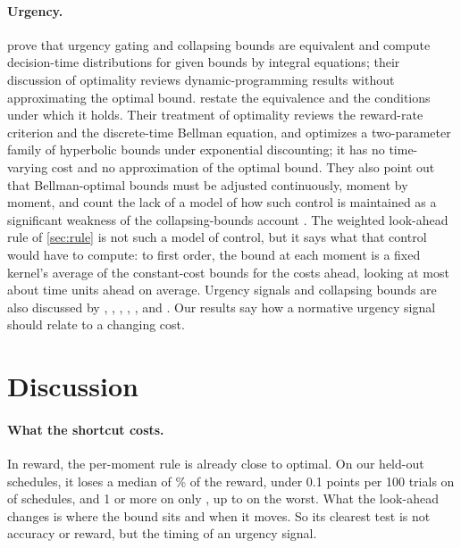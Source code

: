 \documentclass[11pt]{article}
\theoremstyle{definition}
\theoremstyle{remark}
\begin{document}
\paragraph{Urgency.}
\citet{smith2022} prove that urgency gating and collapsing bounds are equivalent and compute
decision-time distributions for given bounds by integral equations; their discussion of optimality
reviews dynamic-programming results without approximating the optimal bound.
 restate the equivalence and the conditions under which it holds. Their
treatment of optimality reviews the reward-rate criterion and the discrete-time Bellman equation,
and optimizes a two-parameter family of hyperbolic bounds under exponential discounting; it has no
time-varying cost and no approximation of the optimal bound. They also point out that Bellman-optimal bounds must be adjusted continuously, moment by moment,
and count the lack of a model of how such control is maintained as a significant weakness of the
collapsing-bounds account \citep[p.~163]{smith2025}. The weighted look-ahead rule of
\cref{sec:rule} is not such a model of control, but it says what that control would have to
compute: to first order, the bound at each moment is a fixed kernel's average of the
constant-cost bounds for the costs ahead, looking at most about \MaxLookAhead{} time units ahead on
average. Urgency signals and
collapsing bounds are also discussed by \citet{cisek2009},
\citet{thura2012}, \citet{hanks2014}, \citet{murphy2016}, \citet{hawkins2015}, and
\citet{voskuilen2016}. Our results say how a normative urgency signal should
relate to a changing cost.

\section{Discussion}
\label{sec:discussion}

\paragraph{What the shortcut costs.}
In reward, the per-moment rule is already close to optimal. On our held-out schedules, it loses a
median of \HeldShareMedian\% of the reward, under 0.1 points per 100 trials on
\HeldPerMomentUnderTenth{} of \HeldCount{} schedules, and 1 or more on only \HeldPerMomentOverOne,
up to \HeldPerMomentMax{} on the worst. What the look-ahead changes is where the bound sits and
when it moves. So its clearest test is not accuracy or reward, but the timing of an urgency signal.
\end{document}

